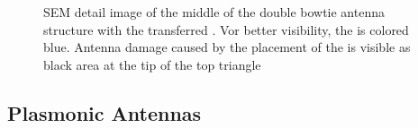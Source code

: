 	\begin{figure}[tp]
		\centering
		\caption{SEM detail image of the middle of the double bowtie antenna structure with the transferred \nd. Vor better visibility, the \nd is colored blue. Antenna damage caused by the placement of the \nd is visible as black area at the tip of the top triangle}
		\label{fig::place_antenna_sem}
	\end{figure}

	\subsection{Plasmonic Antennas}


